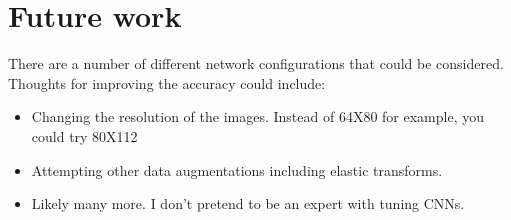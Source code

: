 \documentclass[letterpaper]{article}
\begin{document}
\section{Future work}
There are a number of different network configurations that could be considered. Thoughts for improving the accuracy could include:
\begin{itemize}
  \item Changing the resolution of the images. Instead of 64X80 for example, you could try 80X112
  \item Attempting other data augmentations including elastic transforms. 
  \item Likely many more. I don't pretend to be an expert with tuning CNNs.
  
\end{itemize}


\end{document}
